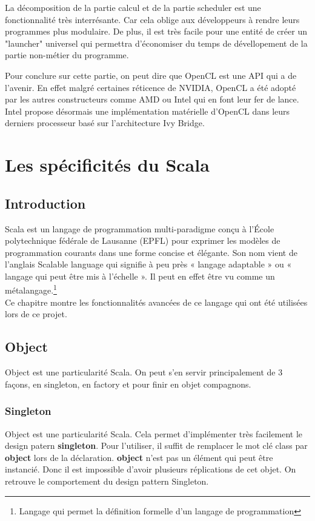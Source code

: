 \documentclass[a4paper,11pt]{report}
\begin{document}
{\normalsize{La décomposition de la partie calcul et de la partie scheduler est une fonctionnalité très interrésante. Car cela oblige aux développeurs à rendre leurs programmes plus modulaire. De plus, il est très facile pour une entité de créer un "launcher" universel qui permettra d'économiser du temps de dévellopement de la partie non-métier du programme.\\
}

\normalsize{
Pour conclure sur cette partie, on peut dire que OpenCL est une API qui a de l'avenir. En effet malgré certaines réticence de NVIDIA, OpenCL a été adopté par les autres constructeurs comme AMD ou Intel qui en font leur fer de lance. Intel propose désormais une implémentation matérielle d'OpenCL dans leurs derniers processeur basé sur l'architecture Ivy Bridge.
} 


\chapter{Les spécificités du Scala}

\section{Introduction}
\vspace{6mm}
\normalsize{
Scala est un langage de programmation multi-paradigme conçu à l'École polytechnique fédérale de Lausanne (EPFL) \cite{Odersky.etal.2004} pour exprimer les modèles de programmation courants dans une forme concise et élégante. Son nom vient de l'anglais Scalable language qui signifie à peu près « langage adaptable » ou « langage qui peut être mis à l'échelle ». Il peut en effet être vu comme un métalangage.\footnote{Langage qui permet la définition formelle d'un langage de programmation }\\
Ce chapitre montre les fonctionnalités avancées de ce langage qui ont été utilisées lors de ce projet.
}

\section{Object}
\vspace{6mm}
\normalsize{
Object est une particularité Scala. On peut s'en servir principalement de 3 façons, en singleton, en factory et pour finir en objet compagnons.
} 

\subsection{Singleton}
\vspace{6mm}
\normalsize{
Object est une particularité Scala. Cela permet d'implémenter très facilement le design patern {\bf singleton}. Pour l'utiliser, il suffit de remplacer le mot clé class par {\bf object} lors de la déclaration. {\bf object} n'est pas un élément qui peut être instancié. Donc il est impossible d'avoir plusieurs réplications de cet objet. On retrouve le comportement du design pattern Singleton. 
}

}
\end{document}
